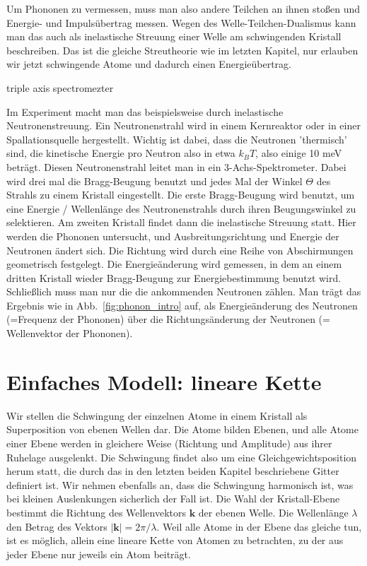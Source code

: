 Um Phononen zu vermessen, muss man also andere Teilchen an ihnen stoßen und Energie- und Impulsübertrag messen. Wegen des Welle-Teilchen-Dualismus kann man das auch als inelastische Streuung einer Welle am schwingenden Kristall beschreiben. Das ist die gleiche Streutheorie wie im letzten Kapitel, nur erlauben wir jetzt schwingende Atome und dadurch einen Energieübertrag.

\begin{marginfigure}
\caption{triple axis spectromezter}

\end{marginfigure}

Im Experiment macht man das beispielsweise durch inelastische Neutronenstreuung. Ein Neutronenstrahl wird in einem Kernreaktor oder in einer Spallationsquelle  hergestellt. Wichtig ist dabei, dass die Neutronen 'thermisch' sind, die kinetische Energie pro  Neutron also in etwa $k_B T$, also einige 10 meV beträgt. Diesen Neutronenstrahl leitet man in ein 3-Achs-Spektrometer. Dabei wird drei mal die Bragg-Beugung benutzt und jedes Mal der Winkel $\Theta$ des Strahls zu einem Kristall eingestellt. Die erste Bragg-Beugung wird benutzt, um eine Energie / Wellenlänge des Neutronenstrahls durch ihren Beugungswinkel zu selektieren. Am zweiten Kristall findet dann die inelastische Streuung statt. Hier werden die Phononen untersucht, und Ausbreitungsrichtung und Energie der Neutronen ändert sich. Die Richtung wird durch eine Reihe von Abschirmungen geometrisch festgelegt. Die Energieänderung wird gemessen, in dem an einem dritten Kristall wieder Bragg-Beugung zur Energiebestimmung benutzt wird. Schließlich muss man nur die die ankommenden Neutronen zählen. Man trägt das Ergebnis wie in Abb.~\ref{fig:phonon_intro} auf, als Energieänderung des Neutronen (=Frequenz der Phononen) über die Richtungsänderung der Neutronen (= Wellenvektor der Phononen).

\section{Einfaches Modell: lineare Kette}

Wir stellen die Schwingung der einzelnen Atome in einem Kristall als Superposition von ebenen Wellen dar. Die Atome bilden Ebenen, und alle Atome einer Ebene werden in gleichere Weise (Richtung und Amplitude) aus ihrer Ruhelage ausgelenkt. Die Schwingung findet also um eine Gleichgewichtsposition herum statt, die durch das in den letzten beiden Kapitel beschriebene Gitter definiert ist. Wir nehmen ebenfalls an, dass die Schwingung harmonisch ist, was bei kleinen Auslenkungen sicherlich der Fall ist. Die Wahl der Kristall-Ebene bestimmt die Richtung des Wellenvektors $\mathbf{k}$ der ebenen Welle. Die Wellenlänge $\lambda$ den Betrag des Vektors $|\mathbf{k}| = 2 \pi / \lambda$. Weil alle Atome in der Ebene das gleiche tun, ist es möglich, allein eine lineare Kette von Atomen zu betrachten, zu der aus jeder Ebene nur jeweils ein Atom beiträgt.

